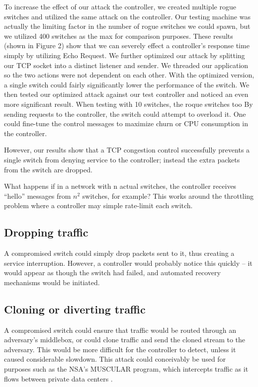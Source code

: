    To increase the effect of our attack the controller, we created multiple rogue switches and utilized the same attack on the controller. Our testing machine was actually the limiting factor in the number of rogue switches we could spawn, but we utilized 400 switches as the max for comparison purposes. These results (shown in Figure 2) show that we can severely effect a controller's response time simply by utilizing Echo Request. We further optimized our attack by splitting our TCP socket into a distinct listener and sender. We threaded our application so the two actions were not dependent on each other. With the optimized version, a single switch could fairly significantly lower the performance of the switch. We then tested our optimized attack against our test controller and noticed an even more significant result. When testing with 10 switches, the roque switches 
 too
By sending requests to the controller, the switch could attempt to overload it. One could fine-tune the control messages to maximize churn or CPU consumption in the controller.

However, our results show that a TCP congestion control successfully prevents a single switch from denying service to the controller; instead the extra packets from the switch are dropped.

What happens if in a network with n actual switches, the controller receives “hello” messages from $n^2$ switches, for example? This works around the throttling problem where a controller may simple rate-limit each switch.

\subsection{Dropping traffic} 
A compromised switch could simply drop packets sent to it, thus creating a service interruption. However, a controller would probably notice this quickly -- it would appear as though the switch had failed, and automated recovery mechanisms would be initiated.

\subsection{Cloning or diverting traffic}
A compromised switch could ensure that traffic would be routed through an adversary’s middlebox, or could clone traffic and send the cloned stream to the adversary. This would be more difficult for the controller to detect, unless it caused considerable slowdown. This attack could conceivably be used for purposes such as the NSA’s MUSCULAR program, which intercepts traffic as it flows between private data centers \cite{muscular}. 

